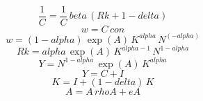 \begin{dmath}
\frac{1}{{C}}=\frac{1}{{C}}\, {beta}\, \left({Rk}+1-{delta}\right)
\end{dmath}
\begin{dmath}
{w}={C}\, {con}
\end{dmath}
\begin{dmath}
{w}=\left(1-{alpha}\right)\, \exp\left({A}\right)\, {K}^{{alpha}}\, {N}^{\left(-{alpha}\right)}
\end{dmath}
\begin{dmath}
{Rk}={alpha}\, \exp\left({A}\right)\, {K}^{{alpha}-1}\, {N}^{1-{alpha}}
\end{dmath}
\begin{dmath}
{Y}={N}^{1-{alpha}}\, \exp\left({A}\right)\, {K}^{{alpha}}
\end{dmath}
\begin{dmath}
{Y}={C}+{I}
\end{dmath}
\begin{dmath}
{K}={I}+\left(1-{delta}\right)\, {K}
\end{dmath}
\begin{dmath}
{A}={A}\, {rhoA}+{eA}
\end{dmath}
